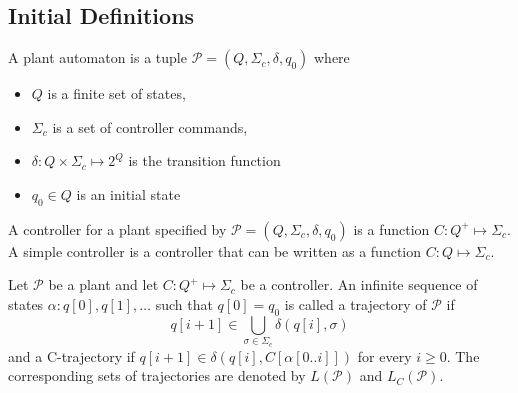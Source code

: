 \documentclass[table]{beamer}
\newcommand{\Plant}{\ensuremath{\mathcal{P}=(Q,\Sigma_c,\delta, q_0)}}
\newcommand{\Controller}{\ensuremath{C:Q^+\longmapsto \Sigma_c}}
\begin{document}
\subsection{Initial Definitions}
\begin{frame}
	\begin{dfn}[Plant]
		A plant automaton is a tuple $\Plant$ where
		\begin{itemize}
			\item $Q$ is a finite set of states,
			\item $\Sigma_c$ is a set of controller commands,
			\item $\delta:Q \times \Sigma_c \longmapsto 2^Q$ is the transition function
			\item $q_0 \in Q$ is an initial state
		\end{itemize}
	\end{dfn}

\end{frame}

\begin{frame}
	\begin{dfn}[Controllers]
		A controller for a plant specified by $\Plant$ 
		is a function $\Controller$. A simple controller is a controller that 
		can be written as a function $C:Q \longmapsto \Sigma_c$.
	\end{dfn}
\end{frame}

\begin{frame}
	\begin{dfn}[Trajectories]
		Let $\mathcal{P}$ be a plant and let $\Controller$ be a controller. 
		An infinite sequence of states $\alpha:q[0],q[1],\ldots$ such that
		 $q[0]=q_0$ is called a trajectory of $\mathcal{P}$ if 
		$$q[i+1] \in \bigcup_{\sigma \in \Sigma_c}\delta(q[i],\sigma)$$
		and a C-trajectory if $q[i+1] \in \delta(q[i],C[\alpha[0..i]])$ for every $i\geq 0$.
		The corresponding sets of trajectories are denoted by $L(\mathcal{P})$ and $L_C(\mathcal{P})$.
	\end{dfn}
\end{frame}
\end{document}
